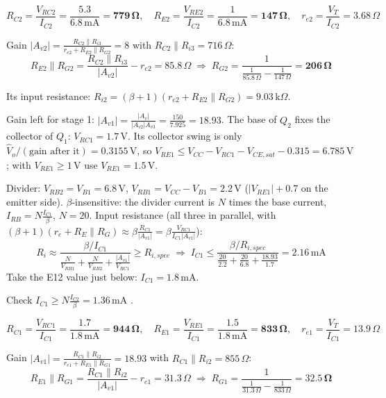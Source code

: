 \documentclass[11pt]{article}
\newcommand{\solstep}[2]{\par\medskip{\color{stepc}\textbf{Step #1 --- #2}}\par\nopagebreak}
\begin{document}
\[R_{C2} = \frac{V_{RC2}}{I_{C2}} = \frac{5.3}{6.8\,\mathrm{m}\mathrm{A}} = \mathbf{779\,\Omega},\quad R_{E2} = \frac{V_{RE2}}{I_{C2}} = \frac{1}{6.8\,\mathrm{m}\mathrm{A}} = \mathbf{147\,\Omega},\quad r_{e2} = \frac{V_T}{I_{C2}} = 3.68\,\Omega\]

Gain $|A_{v2}| = \frac{R_{C2}\|R_{i3}}{r_{e2} + R_{E2}\|R_{G2}} = 8$ with $R_{C2}\|R_{i3} = 716\,\Omega$:\[R_{E2}\|R_{G2} = \frac{R_{C2}\|R_{i3}}{|A_{v2}|} - r_{e2} = 85.8\,\Omega \;\Rightarrow\; R_{G2} = \frac{1}{\frac{1}{85.8\,\Omega} - \frac{1}{147\,\Omega}} = \mathbf{206\,\Omega}\]

Its input resistance: $R_{i2} = (\beta+1)(r_{e2} + R_{E2}\|R_{G2}) = 9.03\,\mathrm{k}\Omega$.
\solstep{4}{Input stage ($Q_1$)}Gain left for stage 1: $|A_{v1}| = \frac{|A_v|}{|A_{v2}| A_{v3}} = \frac{150}{7.925} = 18.93$. The base of $Q_2$ fixes the collector of $Q_1$: $V_{RC1} = 1.7\,\mathrm{V}$. Its collector swing is only $\hat V_o/(\text{gain after it}) = 0.3155\,\mathrm{V}$, so $V_{RE1} \le V_{CC} - V_{RC1} - V_{CE,sat} - 0.315 = 6.785\,\mathrm{V}$; with $V_{RE1} \ge 1$\,V use $V_{RE1} = 1.5$\,V.

Divider: $V_{RB2} = V_{B1} = 6.8\,\mathrm{V}$, $V_{RB1} = V_{CC} - V_{B1} = 2.2\,\mathrm{V}$ ($|V_{RE1}| + 0.7$ on the emitter side). $\beta$-insensitive: the divider current is $N$ times the base current, $I_{RB} = N\frac{I_{C1}}{\beta}$, $N = 20$. Input resistance (all three in parallel, with $(\beta+1)(r_e + R_E\|R_G) \approx \beta\frac{R_{C1}}{|A_{v1}|} = \beta\frac{V_{RC1}}{I_{C1}|A_{v1}|}$):\[R_i \approx \frac{\beta/I_{C1}}{\frac{N}{V_{RB1}} + \frac{N}{V_{RB2}} + \frac{|A_{v1}|}{V_{RC1}}} \ge R_{i,spec} \;\Rightarrow\; I_{C1} \le \frac{\beta/R_{i,spec}}{\frac{20}{2.2} + \frac{20}{6.8} + \frac{18.93}{1.7}} = 2.16\,\mathrm{m}\mathrm{A}\]Take the E12 value just below: $I_{C1} = 1.8\,\mathrm{m}\mathrm{A}$. 

Check $I_{C1} \ge N\frac{I_{C2}}{\beta} = 1.36\,\mathrm{m}\mathrm{A}$ \checkmark. 

\[R_{C1} = \frac{V_{RC1}}{I_{C1}} = \frac{1.7}{1.8\,\mathrm{m}\mathrm{A}} = \mathbf{944\,\Omega},\quad R_{E1} = \frac{V_{RE1}}{I_{C1}} = \frac{1.5}{1.8\,\mathrm{m}\mathrm{A}} = \mathbf{833\,\Omega},\quad r_{e1} = \frac{V_T}{I_{C1}} = 13.9\,\Omega\]

Gain $|A_{v1}| = \frac{R_{C1}\|R_{i2}}{r_{e1} + R_{E1}\|R_{G1}} = 18.93$ with $R_{C1}\|R_{i2} = 855\,\Omega$:\[R_{E1}\|R_{G1} = \frac{R_{C1}\|R_{i2}}{|A_{v1}|} - r_{e1} = 31.3\,\Omega \;\Rightarrow\; R_{G1} = \frac{1}{\frac{1}{31.3\,\Omega} - \frac{1}{833\,\Omega}} = \mathbf{32.5\,\Omega}\]
\end{document}
